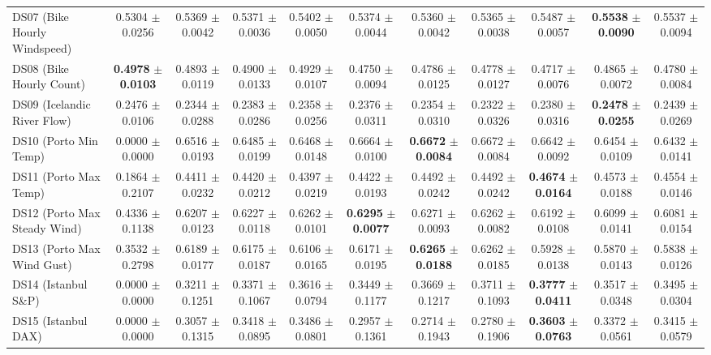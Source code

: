 \begin{table}[t]
{{\begin{tabular}{lcccccccccc}
DS07 (Bike Hourly Windspeed) & 0.5304 $\pm$ 0.0256 & 0.5369 $\pm$ 0.0042 & 0.5371 $\pm$ 0.0036 & 0.5402 $\pm$ 0.0050 & 0.5374 $\pm$ 0.0044 & 0.5360 $\pm$ 0.0042 & 0.5365 $\pm$ 0.0038 & 0.5487 $\pm$ 0.0057 & \textbf{0.5538} $\pm$ \textbf{0.0090} & 0.5537 $\pm$ 0.0094 \\
DS08 (Bike Hourly Count) & \textbf{0.4978} $\pm$ \textbf{0.0103} & 0.4893 $\pm$ 0.0119 & 0.4900 $\pm$ 0.0133 & 0.4929 $\pm$ 0.0107 & 0.4750 $\pm$ 0.0094 & 0.4786 $\pm$ 0.0125 & 0.4778 $\pm$ 0.0127 & 0.4717 $\pm$ 0.0076 & 0.4865 $\pm$ 0.0072 & 0.4780 $\pm$ 0.0084 \\
DS09 (Icelandic River Flow) & 0.2476 $\pm$ 0.0106 & 0.2344 $\pm$ 0.0288 & 0.2383 $\pm$ 0.0286 & 0.2358 $\pm$ 0.0256 & 0.2376 $\pm$ 0.0311 & 0.2354 $\pm$ 0.0310 & 0.2322 $\pm$ 0.0326 & 0.2380 $\pm$ 0.0316 & \textbf{0.2478} $\pm$ \textbf{0.0255} & 0.2439 $\pm$ 0.0269 \\
DS10 (Porto Min Temp) & 0.0000 $\pm$ 0.0000 & 0.6516 $\pm$ 0.0193 & 0.6485 $\pm$ 0.0199 & 0.6468 $\pm$ 0.0148 & 0.6664 $\pm$ 0.0100 & \textbf{0.6672} $\pm$ \textbf{0.0084} & 0.6672 $\pm$ 0.0084 & 0.6642 $\pm$ 0.0092 & 0.6454 $\pm$ 0.0109 & 0.6432 $\pm$ 0.0141 \\
DS11 (Porto Max Temp) & 0.1864 $\pm$ 0.2107 & 0.4411 $\pm$ 0.0232 & 0.4420 $\pm$ 0.0212 & 0.4397 $\pm$ 0.0219 & 0.4422 $\pm$ 0.0193 & 0.4492 $\pm$ 0.0242 & 0.4492 $\pm$ 0.0242 & \textbf{0.4674} $\pm$ \textbf{0.0164} & 0.4573 $\pm$ 0.0188 & 0.4554 $\pm$ 0.0146 \\
DS12 (Porto Max Steady Wind) & 0.4336 $\pm$ 0.1138 & 0.6207 $\pm$ 0.0123 & 0.6227 $\pm$ 0.0118 & 0.6262 $\pm$ 0.0101 & \textbf{0.6295} $\pm$ \textbf{0.0077} & 0.6271 $\pm$ 0.0093 & 0.6262 $\pm$ 0.0082 & 0.6192 $\pm$ 0.0108 & 0.6099 $\pm$ 0.0141 & 0.6081 $\pm$ 0.0154 \\
DS13 (Porto Max Wind Gust) & 0.3532 $\pm$ 0.2798 & 0.6189 $\pm$ 0.0177 & 0.6175 $\pm$ 0.0187 & 0.6106 $\pm$ 0.0165 & 0.6171 $\pm$ 0.0195 & \textbf{0.6265} $\pm$ \textbf{0.0188} & 0.6262 $\pm$ 0.0185 & 0.5928 $\pm$ 0.0138 & 0.5870 $\pm$ 0.0143 & 0.5838 $\pm$ 0.0126 \\
DS14 (Istanbul S\&P) & 0.0000 $\pm$ 0.0000 & 0.3211 $\pm$ 0.1251 & 0.3371 $\pm$ 0.1067 & 0.3616 $\pm$ 0.0794 & 0.3449 $\pm$ 0.1177 & 0.3669 $\pm$ 0.1217 & 0.3711 $\pm$ 0.1093 & \textbf{0.3777} $\pm$ \textbf{0.0411} & 0.3517 $\pm$ 0.0348 & 0.3495 $\pm$ 0.0304 \\
DS15 (Istanbul DAX) & 0.0000 $\pm$ 0.0000 & 0.3057 $\pm$ 0.1315 & 0.3418 $\pm$ 0.0895 & 0.3486 $\pm$ 0.0801 & 0.2957 $\pm$ 0.1361 & 0.2714 $\pm$ 0.1943 & 0.2780 $\pm$ 0.1906 & \textbf{0.3603} $\pm$ \textbf{0.0763} & 0.3372 $\pm$ 0.0561 & 0.3415 $\pm$ 0.0579 \\

\end{tabular}}}
\end{table}
